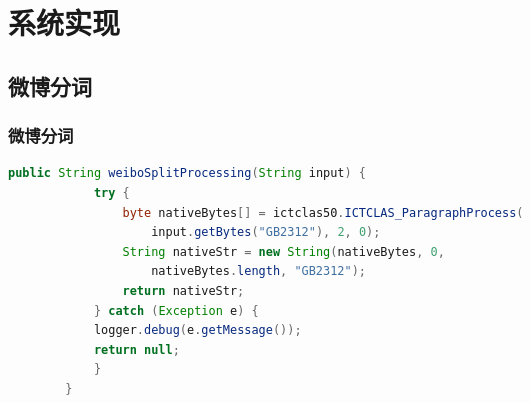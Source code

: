 \documentclass[CJKutf8, table]{beamer}
\begin{document}
\begin{CJK}{UTF8}{gbsn}
\begin{frame}
\begin{columns}
\begin{tiny}
\begin{itemize}
    \end{itemize}
    \end{tiny}
  \end{columns}
\end{frame}

\section{系统实现}

\subsection{微博分词}
\begin{frame}[fragile]
  \frametitle{微博分词}
  \lstset{language=Java,basicstyle=\ttfamily,commentstyle=\ttfamily}
  \begin{tiny}
    \begin{block}{}
      \begin{lstlisting}[language=Java]
        public String weiboSplitProcessing(String input) {
            try {
                byte nativeBytes[] = ictclas50.ICTCLAS_ParagraphProcess(
                    input.getBytes("GB2312"), 2, 0);
                String nativeStr = new String(nativeBytes, 0,
                    nativeBytes.length, "GB2312");
                return nativeStr;
            } catch (Exception e) {
            logger.debug(e.getMessage());
            return null;
            }
        }
    \end{lstlisting}
    \end{block}
  \end{tiny}
\end{frame}



\end{CJK}
\end{document}
